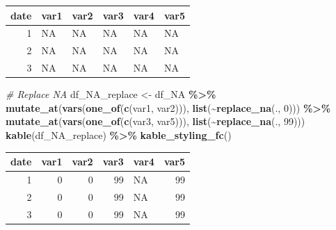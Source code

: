 \documentclass[
]{book}
\newenvironment{Shaded}{\begin{snugshade}}{\end{snugshade}}
\newcommand{\CommentTok}[1]{\textcolor[rgb]{0.56,0.35,0.01}{\textit{#1}}}
\newcommand{\DecValTok}[1]{\textcolor[rgb]{0.00,0.00,0.81}{#1}}
\newcommand{\KeywordTok}[1]{\textcolor[rgb]{0.13,0.29,0.53}{\textbf{#1}}}
\newcommand{\NormalTok}[1]{#1}
\newcommand{\OperatorTok}[1]{\textcolor[rgb]{0.81,0.36,0.00}{\textbf{#1}}}
\newcommand{\StringTok}[1]{\textcolor[rgb]{0.31,0.60,0.02}{#1}}
\begin{document}
\begin{table}[!h]
\centering
\begin{tabular}{r|l|l|l|l|l}
\hline
date & var1 & var2 & var3 & var4 & var5\\
\hline
\rowcolor{gray!6}  1 & NA & NA & NA & NA & NA\\
\hline
2 & NA & NA & NA & NA & NA\\
\hline
\rowcolor{gray!6}  3 & NA & NA & NA & NA & NA\\
\hline
\end{tabular}
\end{table}

\begin{Shaded}
\begin{Highlighting}[]
\CommentTok{\# Replace NA}
\NormalTok{df\_NA\_replace \textless{}{-}}\StringTok{ }\NormalTok{df\_NA }\OperatorTok{\%\textgreater{}\%}
\StringTok{  }\KeywordTok{mutate\_at}\NormalTok{(}\KeywordTok{vars}\NormalTok{(}\KeywordTok{one\_of}\NormalTok{(}\KeywordTok{c}\NormalTok{(}\StringTok{\textquotesingle{}var1\textquotesingle{}}\NormalTok{, }\StringTok{\textquotesingle{}var2\textquotesingle{}}\NormalTok{))), }\KeywordTok{list}\NormalTok{(}\OperatorTok{\textasciitilde{}}\KeywordTok{replace\_na}\NormalTok{(., }\DecValTok{0}\NormalTok{))) }\OperatorTok{\%\textgreater{}\%}
\StringTok{  }\KeywordTok{mutate\_at}\NormalTok{(}\KeywordTok{vars}\NormalTok{(}\KeywordTok{one\_of}\NormalTok{(}\KeywordTok{c}\NormalTok{(}\StringTok{\textquotesingle{}var3\textquotesingle{}}\NormalTok{, }\StringTok{\textquotesingle{}var5\textquotesingle{}}\NormalTok{))), }\KeywordTok{list}\NormalTok{(}\OperatorTok{\textasciitilde{}}\KeywordTok{replace\_na}\NormalTok{(., }\DecValTok{99}\NormalTok{)))}
\KeywordTok{kable}\NormalTok{(df\_NA\_replace) }\OperatorTok{\%\textgreater{}\%}
\StringTok{  }\KeywordTok{kable\_styling\_fc}\NormalTok{()}
\end{Highlighting}
\end{Shaded}

\begin{table}[!h]
\centering
\begin{tabular}{r|r|r|r|l|r}
\hline
date & var1 & var2 & var3 & var4 & var5\\
\hline
\rowcolor{gray!6}  1 & 0 & 0 & 99 & NA & 99\\
\hline
2 & 0 & 0 & 99 & NA & 99\\
\hline
\rowcolor{gray!6}  3 & 0 & 0 & 99 & NA & 99\\
\hline
\end{tabular}
\end{table}
\end{document}
